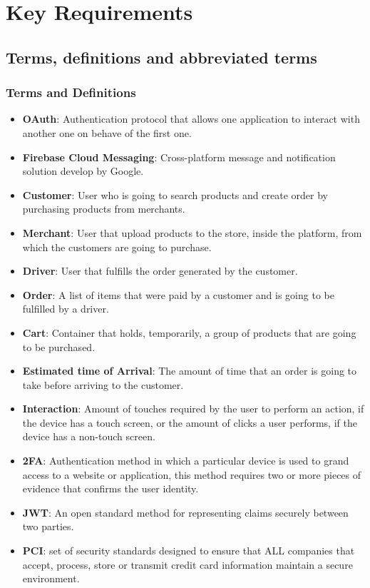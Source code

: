 \section{Key Requirements}
\subsection{Terms, definitions and abbreviated terms}
\subsubsection{Terms and Definitions}
\begin{itemize}
    \item \textbf{OAuth}: Authentication protocol that allows one application 
    to interact with another one on behave of the first one.
    \item \textbf{Firebase Cloud Messaging}: Cross-platform message and 
    notification solution develop by Google.
    \item \textbf{Customer}: User who is going to search products and create 
    order by purchasing products from merchants.
    \item \textbf{Merchant}: User that upload products to the store, 
    inside the platform, from which the customers are going to purchase. 
    \item \textbf{Driver}: User that fulfills the order generated by the 
    customer. 
    \item \textbf{Order}: A list of items that were paid by a customer and 
    is going to be fulfilled by a driver.
    \item \textbf{Cart}: Container that holds, temporarily, a group of products 
    that are going to be purchased.
    \item \textbf{Estimated time of Arrival}: The amount of time that 
    an order is going to take before arriving to the customer.
    \item \textbf{Interaction}: Amount of touches required by the user to 
    perform an action, if the device has a touch screen, or the amount of 
    clicks a user performs, if the device has a non-touch screen.
    \item \textbf{2FA}: Authentication method in which a particular device is 
    used to grand access to a website or application, this method requires 
    two or more pieces of evidence that confirms the user identity.
    \item \textbf{JWT}: An open standard method for representing claims 
    securely between two parties.
    \item \textbf{PCI}: set of security standards designed to ensure that ALL 
    companies that accept, process, store or transmit credit card 
    information maintain a secure environment. \cite{pci}
\end{itemize}
